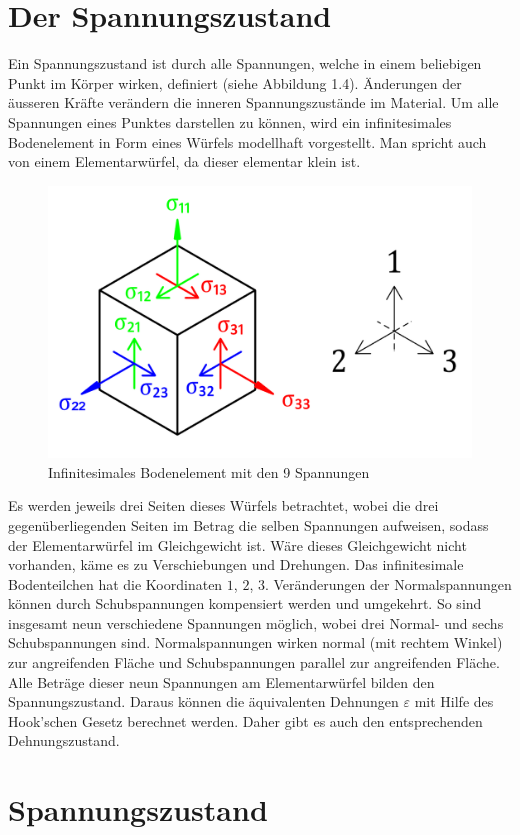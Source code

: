 \section{Der Spannungszustand\label{spannung:section:Der Spannungsustand}}
Ein Spannungszustand ist durch alle Spannungen, welche in einem beliebigen Punkt im Körper wirken, definiert (siehe Abbildung 1.4).
Änderungen der äusseren Kräfte verändern die inneren Spannungszustände im Material.
Um alle Spannungen eines Punktes darstellen zu können, wird ein infinitesimales Bodenelement in Form eines Würfels modellhaft vorgestellt.
Man spricht auch von einem Elementarwürfel, da dieser elementar klein ist.

\begin{figure}
	\centering
	\includegraphics[width=0.4\linewidth,keepaspectratio]{papers/spannung/Grafiken/Bild2.png}
	\caption{Infinitesimales Bodenelement mit den 9 Spannungen}
	\label{fig:Bild2}
\end{figure}

Es werden jeweils drei Seiten dieses Würfels betrachtet, wobei die drei gegenüberliegenden Seiten im Betrag die selben Spannungen aufweisen,
sodass der Elementarwürfel im Gleichgewicht ist.
Wäre dieses Gleichgewicht nicht vorhanden, käme es zu Verschiebungen und Drehungen.
Das infinitesimale Bodenteilchen hat die Koordinaten $1$, $2$, $3$.
Veränderungen der Normalspannungen können durch Schubspannungen kompensiert werden und umgekehrt.
So sind insgesamt neun verschiedene Spannungen möglich, wobei drei Normal- und sechs Schubspannungen sind.
Normalspannungen wirken normal (mit rechtem Winkel) zur angreifenden Fläche und Schubspannungen parallel zur angreifenden Fläche.
Alle Beträge dieser neun Spannungen am Elementarwürfel bilden den Spannungszustand.
Daraus können die äquivalenten Dehnungen $\varepsilon$ mit Hilfe des Hook'schen Gesetz berechnet werden.
Daher gibt es auch den entsprechenden Dehnungszustand.


\section{Spannungszustand\label{spannung:section:Spannungsustand}}

